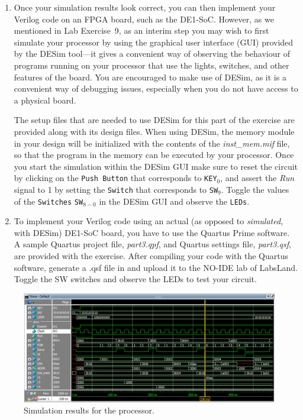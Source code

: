 \documentclass[epsfig,10pt,fullpage]{article} \addtolength{\textwidth}{1.5in}
\begin{document}
\begin{enumerate}
An example simulation result for a correctly-designed circuit 
is given in Figure~\ref{fig:part3}. It shows the execution of the first four instructions
in Figure~\ref{fig:assembly}.

\item Once your simulation results look correct, you can then implement your Verilog
code on an FPGA board, such as the DE1-SoC. However, as we mentioned in Lab Exercise~9, as
an interim step you may wish to first simulate your processor by using the graphical user
interface (GUI) provided by the DESim tool---it gives a convenient way of observing the behaviour 
of programs running on your processor that use the lights, switches, and other features of 
the board. You are encouraged to make use of DESim, as it
is a convenient way of debugging issues, especially when you do not have access to a 
physical board.

The setup files that are needed to use DESim for this part of the exercise are provided along
with its design files.  When using DESim, the memory module in your design will be initialized with
the contents of the {\it inst\_mem.mif} file, so that the program in the memory 
can be executed by your processor. Once you start the simulation within the DESim GUI make sure to 
reset the circuit by clicking on the \texttt{Push Button} that corresponds to
\texttt{KEY}$_0$, and assert the {\it Run} signal to 1 by setting the \texttt{Switch}
that corresponds to \texttt{SW}$_9$. Toggle the values of the \texttt{Switches}
\texttt{SW}$_{8-0}$ in the DESim GUI and observe the \texttt{LEDs}. 

\item
To implement your Verilog code using an actual (as opposed to {\it simulated}, with DESim) 
DE1-SoC board, you have to use the Quartus Prime software.
A sample Quartus project file, {\it part3.qpf}, and Quartus
settings file, {\it part3.qsf}, are provided with the exercise. After compiling your code 
with the Quartus software, generate a .qsf file in and upload it to the NO-IDE lab of LabsLand. Toggle the SW switches and observe the LEDs to test your circuit.
\end{enumerate}

\begin{figure}[H]
	\begin{center}
		\includegraphics[width=\textwidth]{figures/part3.png}
	\end{center}
	\caption{Simulation results for the processor.}
	\label{fig:part3}
\end{figure}
\end{document}
